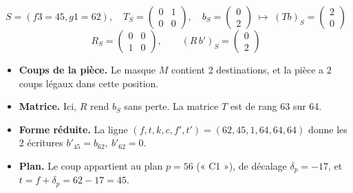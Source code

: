 \[ S = (f3=45, g1=62),\quad T_S = \begin{pmatrix}0 & 1 \\ 0 & 0\end{pmatrix},\quad b_S = \begin{pmatrix}0 \\ 2\end{pmatrix}\;\longmapsto\; (Tb)_S =\begin{pmatrix}2 \\ 0\end{pmatrix} \]
\[ R_S = \begin{pmatrix}0 & 0 \\ 1 & 0\end{pmatrix},\qquad (R\,b')_S = \begin{pmatrix}0 \\ 2\end{pmatrix} \]
\begin{itemize}
\item \textbf{Coups de la pièce.} Le masque $M$ contient 2 destinations, et la pièce a 2 coups légaux dans cette position.
\item \textbf{Matrice.} Ici, $R$ rend $b_S$ sans perte. La matrice $T$ est de rang 63 sur 64.
\item \textbf{Forme réduite.} La ligne $(f, t, k, c, f', t') = (62, 45, 1, 64, 64, 64)$ donne les 2 écritures $b'_{45} = b_{62},\ b'_{62} = 0$.
\item \textbf{Plan.} Le coup appartient au plan $p = 56$ (« C1 »), de décalage $\delta_p = -17$, et $t = f + \delta_p = 62 -17 = 45$.
\end{itemize}
